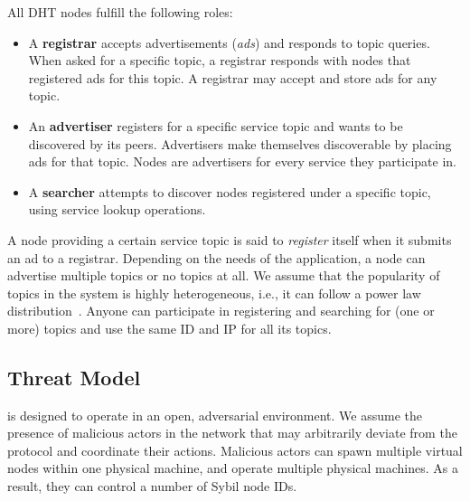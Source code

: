All DHT nodes fulfill the following roles:
\begin{itemize}
    \item A \textbf{registrar} accepts advertisements (\emph{ads}) and responds to topic queries. 
    When asked for a specific topic, a registrar responds with nodes that registered ads for this topic.
    A registrar may accept and store ads for any topic.
    \item An \textbf{advertiser} registers for a specific service topic and wants to be discovered by its peers.
    Advertisers make themselves discoverable by placing ads for that topic.
    Nodes are advertisers for every service they participate in.
    \item A \textbf{searcher} attempts to discover nodes registered under a specific topic, using service lookup operations.
\end{itemize}

A node providing a certain service topic is said to \emph{register} itself when it submits an ad to a registrar. %
Depending on the needs of the application, a node can advertise multiple topics or no topics at all. 
We assume that the popularity of topics in the system is highly heterogeneous, i.e., it can follow a power law distribution~\cite{kim2018measuring}.
Anyone can participate in registering and searching for (one or more) topics and use the same ID and IP for all its topics. 

\subsection{Threat Model}
\label{sec:threat}

\sysname is designed to operate in an open, adversarial environment.
We assume the presence of malicious actors in the network that may arbitrarily deviate from the protocol and coordinate their actions.
Malicious actors can spawn multiple virtual nodes within one physical machine, and operate multiple physical machines.
As a result, they can control a number of Sybil node IDs.


